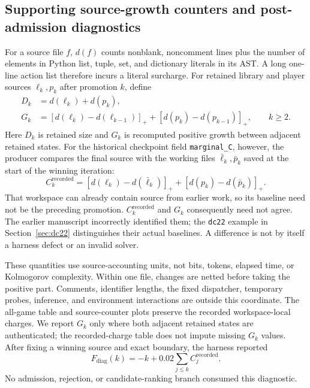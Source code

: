 \documentclass[11pt]{article}
\theoremstyle{definition}
\theoremstyle{remark}
\newcommand{\Pos}[1]{[#1]_{+}}
\begin{document}
\subsection{Supporting source-growth counters and post-admission diagnostics}
For a source file $f$, $d(f)$ counts nonblank, noncomment lines plus the number of
elements in Python list, tuple, set, and dictionary literals in its AST. A long
one-line action list therefore incurs a literal surcharge. For retained library and
player sources $\ell_k,p_k$ after promotion $k$, define
\begin{align}
 D_k&=d(\ell_k)+d(p_k),\label{eq:retained-description}\\
 G_k&=\Pos{d(\ell_k)-d(\ell_{k-1})}
       +\Pos{d(p_k)-d(p_{k-1})},\qquad k\ge2.\label{eq:marginal-c}
\end{align}
Here $D_k$ is retained size and $G_k$ is recomputed positive growth between adjacent
retained states. For the historical checkpoint field \texttt{marginal\_C}, however,
the producer compares the final source with the working files
$\bar\ell_k,\bar p_k$ saved at the start of the winning iteration:
\begin{equation}
 C_k^{\mathrm{recorded}}
 =\Pos{d(\ell_k)-d(\bar\ell_k)}
  +\Pos{d(p_k)-d(\bar p_k)}.
 \label{eq:recorded-workspace-charge}
\end{equation}
That workspace can already contain source from earlier work, so its baseline need
not be the preceding promotion. $C_k^{\mathrm{recorded}}$ and $G_k$ consequently
need not agree. The earlier manuscript incorrectly identified them; the
\texttt{dc22} example in Section~\ref{sec:dc22} distinguishes their actual baselines.
A difference is not by itself a harness defect or an invalid solver.

These quantities use source-accounting units, not bits, tokens, elapsed time, or
Kolmogorov complexity. Within one file, changes are netted before taking the positive
part. Comments, identifier lengths, the fixed dispatcher, temporary probes, inference,
and environment interactions are outside this coordinate. The all-game table and
source-counter plots preserve the recorded workspace-local charges. We report $G_k$ only
where both adjacent retained states are authenticated; the recorded-charge table
does not impute missing $G_k$ values. After fixing a winning source and exact
boundary, the harness reported
\begin{equation}
 F_{\mathrm{diag}}(k)=-k+0.02\sum_{j\le k}C_j^{\mathrm{recorded}}.
 \label{eq:implemented-diagnostic}
\end{equation}
No admission, rejection, or candidate-ranking branch consumed this diagnostic.
\end{document}
